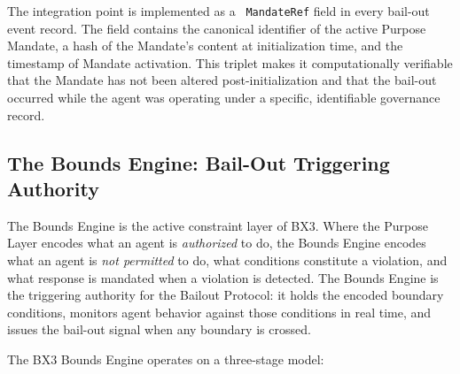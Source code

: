 The integration point is implemented as a \texttt{ MandateRef} field in every bail-out event record. The field contains the canonical identifier of the active Purpose Mandate, a hash of the Mandate's content at initialization time, and the timestamp of Mandate activation. This triplet makes it computationally verifiable that the Mandate has not been altered post-initialization and that the bail-out occurred while the agent was operating under a specific, identifiable governance record.

\subsection{The Bounds Engine: Bail-Out Triggering Authority}
\label{subsection:bailout-bounds-engine}

The Bounds Engine is the active constraint layer of BX3. Where the Purpose Layer encodes what an agent is \textit{authorized} to do, the Bounds Engine encodes what an agent is \textit{not permitted} to do, what conditions constitute a violation, and what response is mandated when a violation is detected. The Bounds Engine is the triggering authority for the Bailout Protocol: it holds the encoded boundary conditions, monitors agent behavior against those conditions in real time, and issues the bail-out signal when any boundary is crossed.

The BX3 Bounds Engine operates on a three-stage model:

